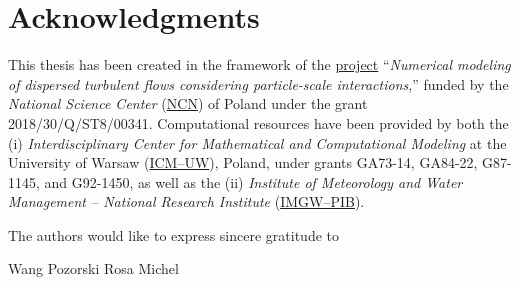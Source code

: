 \documentclass[../thesis.tex]{subfiles}
\begin{document}
\section*{Acknowledgments\label{sec:ack}}

This thesis has been created in the framework of the \href{https://projekty.ncn.gov.pl/en/index.php?projekt_id=417540}{project} ``\emph{Numerical modeling of dispersed turbulent flows considering particle-scale interactions},'' funded by the \textsl{National Science Center} (\href{https://www.ncn.gov.pl/en}{NCN}) of Poland under the grant \mbox{2018/30/Q/ST8/00341}. Computational resources have been provided by both the (i) \textsl{Interdisciplinary Center for Mathematical and Computational Modeling} at the University of Warsaw (\href{https://icm.edu.pl/en/}{ICM--UW}), Poland, under grants \mbox{GA73-14}, \mbox{GA84-22}, \mbox{G87-1145}, and \mbox{G92-1450}, as well as the (ii) \textsl{Institute of Meteorology and Water Management -- National Research Institute} (\href{https://www.imgw.pl/}{IMGW--PIB}).

The authors would like to express sincere gratitude to 

Wang Pozorski Rosa Michel


\newpage
\end{document}
